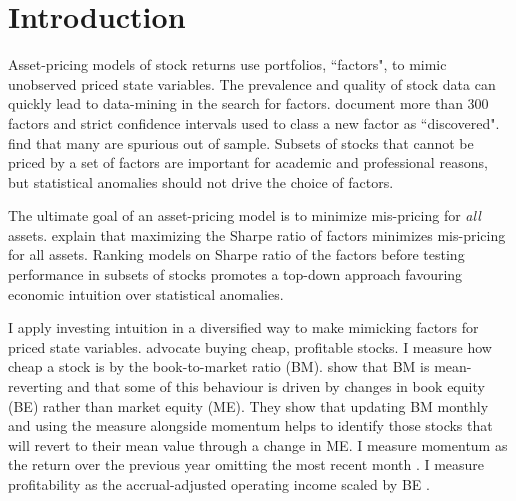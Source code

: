 
\section*{Introduction}


Asset-pricing models of stock returns use portfolios, ``factors", to mimic
unobserved priced state variables.
The prevalence and quality of stock data can quickly lead to data-mining in
the search for factors.
\textcite{harvey2016and} document more than 300 factors and %
strict confidence intervals used to class a new factor as ``discovered".
\textcite{linnainmaa2016history} find that many%
are spurious out of sample.
Subsets of stocks that cannot be priced by a set of factors are important for
academic and professional reasons, but statistical anomalies should not drive
the choice of factors.

The ultimate goal of an asset-pricing model is to minimize mis-pricing for
\emph{all} assets. \textcite{barillas2016alpha} explain that maximizing the
Sharpe ratio of factors minimizes mis-pricing for all assets. Ranking models on
Sharpe ratio of the factors before testing performance in subsets of stocks
promotes a top-down approach favouring economic intuition over statistical
anomalies.

I apply investing intuition in a diversified way to make mimicking factors for
priced state variables.
\textcite{graham1934security} advocate buying cheap, profitable stocks.
I measure how cheap a stock is by the book-to-market ratio (BM).
\textcite{kok2017facts} show that BM is mean-reverting and that some of this
behaviour is driven by changes in book equity (BE) rather than market equity
(ME).
They show that updating BM monthly and using the measure alongside momentum
helps to identify those stocks that will revert to their mean value through a
change in ME.
I measure momentum as the return over the previous year omitting the most
recent month \parencite{fama2016dissecting}.
I measure profitability as the accrual-adjusted operating income scaled by BE
\parencite{ball2016accruals}.

